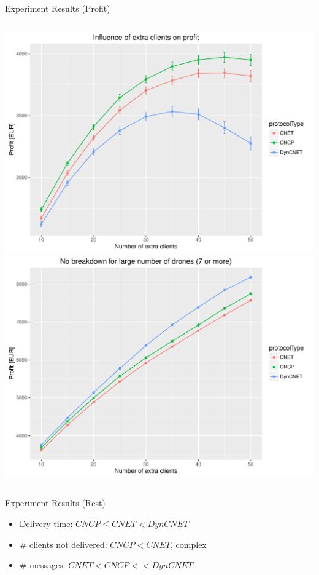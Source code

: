 \documentclass[notes]{beamer}
\begin{document}
\begin{frame}{Experiment Results (Profit)}
\begin{columns}
			\begin{center}	
				\includegraphics[height=0.4\textheight]{dynamicclients-profit}\\
				\includegraphics[height=0.4\textheight]{dynamicclients-profit-largeNbDrones}
			\end{center}
		\end{columns}
	\end{frame}
	\begin{frame}{Experiment Results (Rest)}
		\begin{itemize}
			\item Delivery time: $CNCP \leq CNET < DynCNET$
			\item \# clients not delivered: $CNCP < CNET$, complex
			\item \# messages: $CNET < CNCP << DynCNET$
		\end{itemize}
	\end{frame}
\end{document}
